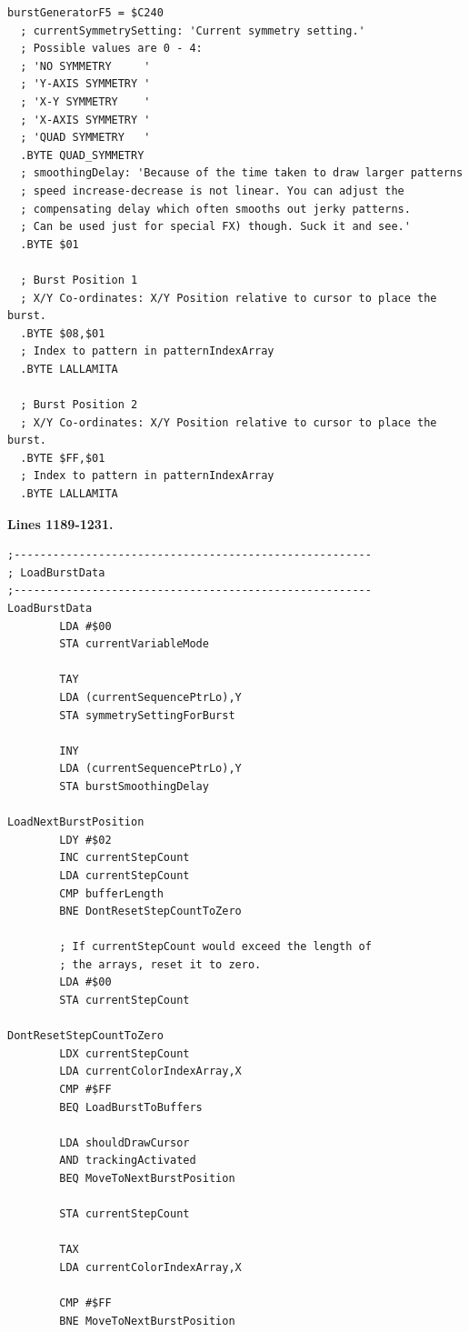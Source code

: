 \begin{lstlisting}[caption=Source code for the F5 Burst.]
burstGeneratorF5 = $C240
  ; currentSymmetrySetting: 'Current symmetry setting.'
  ; Possible values are 0 - 4:
  ; 'NO SYMMETRY     '
  ; 'Y-AXIS SYMMETRY '
  ; 'X-Y SYMMETRY    '
  ; 'X-AXIS SYMMETRY '
  ; 'QUAD SYMMETRY   '
  .BYTE QUAD_SYMMETRY
  ; smoothingDelay: 'Because of the time taken to draw larger patterns
  ; speed increase-decrease is not linear. You can adjust the 
  ; compensating delay which often smooths out jerky patterns. 
  ; Can be used just for special FX) though. Suck it and see.'
  .BYTE $01

  ; Burst Position 1  
  ; X/Y Co-ordinates: X/Y Position relative to cursor to place the burst.
  .BYTE $08,$01
  ; Index to pattern in patternIndexArray
  .BYTE LALLAMITA

  ; Burst Position 2
  ; X/Y Co-ordinates: X/Y Position relative to cursor to place the burst.
  .BYTE $FF,$01
  ; Index to pattern in patternIndexArray
  .BYTE LALLAMITA

\end{lstlisting}

\clearpage
\textbf{Lines 1189-1231. }
\begin{lstlisting}
;-------------------------------------------------------
; LoadBurstData
;-------------------------------------------------------
LoadBurstData    
        LDA #$00
        STA currentVariableMode

        TAY 
        LDA (currentSequencePtrLo),Y
        STA symmetrySettingForBurst

        INY 
        LDA (currentSequencePtrLo),Y
        STA burstSmoothingDelay

LoadNextBurstPosition    
        LDY #$02
        INC currentStepCount
        LDA currentStepCount
        CMP bufferLength
        BNE DontResetStepCountToZero

        ; If currentStepCount would exceed the length of
        ; the arrays, reset it to zero.
        LDA #$00
        STA currentStepCount

DontResetStepCountToZero
        LDX currentStepCount
        LDA currentColorIndexArray,X
        CMP #$FF
        BEQ LoadBurstToBuffers

        LDA shouldDrawCursor
        AND trackingActivated
        BEQ MoveToNextBurstPosition

        STA currentStepCount

        TAX 
        LDA currentColorIndexArray,X

        CMP #$FF
        BNE MoveToNextBurstPosition

\end{lstlisting}
\clearpage

